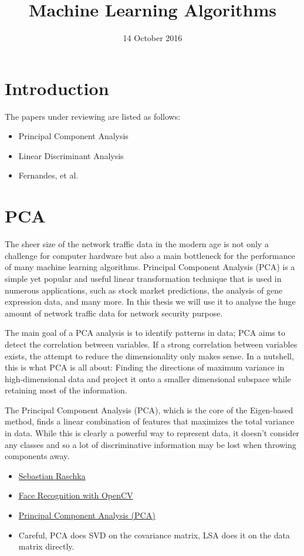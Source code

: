 \documentclass[a4paper]{article}
\title{Machine Learning Algorithms}
\author{}
\date{14 October 2016}
\begin{document}
\maketitle
	

\section{Introduction}

The papers under reviewing are listed as follows:
\begin{itemize}
	\item Principal Component Analysis
	\item Linear Discriminant Analysis 
	\item Fernandes, et al. \cite{fernandes2016network}
\end{itemize}

\section{PCA}
The sheer size of the network traffic data in the modern age is not only a challenge for computer hardware but also a main bottleneck for the performance of many machine learning algorithms. Principal Component Analysis (PCA) is a simple yet popular and useful linear transformation technique that is used in numerous applications, such as stock market predictions, the analysis of gene expression data, and many more. In this thesis we will use it to analyse the huge amount of network traffic data for network security purpose. 

The main goal of a PCA analysis is to identify patterns in data; PCA aims to detect the correlation between variables. If a strong correlation between variables exists, the attempt to reduce the dimensionality only makes sense. In a nutshell, this is what PCA is all about: Finding the directions of maximum variance in high-dimensional data and project it onto a smaller dimensional subspace while retaining most of the information.

The Principal Component Analysis (PCA), which is the core of the Eigen-based method, finds a linear combination of features that maximizes the total variance in data. While this is clearly a powerful way to represent data, it doesn’t consider any classes and so a lot of discriminative information may be lost when throwing components away.

\begin{itemize}
	\item \href{http://sebastianraschka.com/Articles/2015_pca_in_3_steps.html}{Sebastian Raschka}
	\item \href{http://docs.opencv.org/2.4/modules/contrib/doc/facerec/facerec_tutorial.html}{Face Recognition with OpenCV}
	\item \href{https://www.reddit.com/r/math/comments/1vu9ev/principal_component_analysis_pca/}{Principal Component Analysis (PCA)}
	\item Careful, PCA does SVD on the covariance matrix, LSA does it on the data matrix directly.
\end{itemize}
\end{document}
